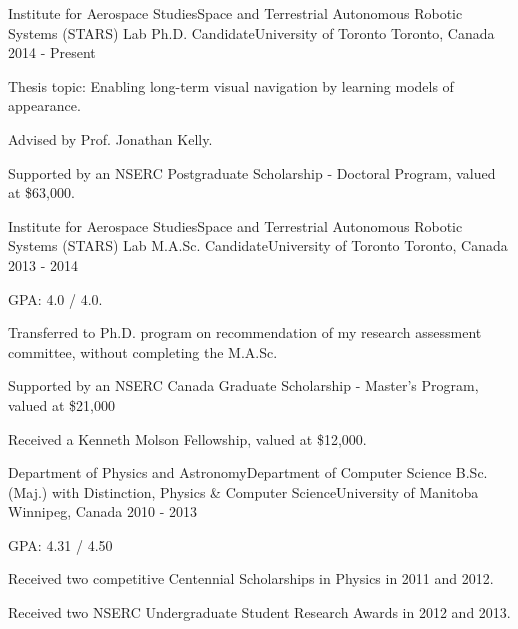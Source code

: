 

\begin{cventries}

  \cventry
    {Institute for Aerospace Studies{\enskip\cdotp\enskip}Space and Terrestrial Autonomous Robotic Systems (STARS) Lab} %
    {Ph.D. Candidate{\enskip\cdotp\enskip}University of Toronto} %
    {Toronto, Canada} %
    {2014 - Present} %
    {
      \begin{cvitems} %
        \item {Thesis topic: Enabling long-term visual navigation by learning models of appearance.}
        \item {Advised by Prof. Jonathan Kelly.}
        \item {Supported by an NSERC Postgraduate Scholarship - Doctoral Program, valued at \$63,000.}
      \end{cvitems}
    }

  \cventry
    {Institute for Aerospace Studies{\enskip\cdotp\enskip}Space and Terrestrial Autonomous Robotic Systems (STARS) Lab} %
    {M.A.Sc. Candidate{\enskip\cdotp\enskip}University of Toronto} %
    {Toronto, Canada} %
    {2013 - 2014} %
    {
      \begin{cvitems} %
        \item {GPA: 4.0 / 4.0.}
        \item {Transferred to Ph.D. program on recommendation of my research assessment committee, without completing the M.A.Sc.}
        \item {Supported by an NSERC Canada Graduate Scholarship - Master’s Program, valued at \$21,000} 
        \item {Received a Kenneth Molson Fellowship, valued at \$12,000.}
      \end{cvitems}
    }

  \cventry
    {Department of Physics and Astronomy{\enskip\cdotp\enskip}Department of Computer Science} %
    {B.Sc. (Maj.) with Distinction, Physics \& Computer Science{\enskip\cdotp\enskip}University of Manitoba} %
    {Winnipeg, Canada} %
    {2010 - 2013} %
    {
      \begin{cvitems} %
        \item {GPA: 4.31 / 4.50}
        \item {Received two competitive Centennial Scholarships in Physics in 2011 and 2012.}
        \item {Received two NSERC Undergraduate Student Research Awards in 2012 and 2013.}
      \end{cvitems}
    }


\end{cventries}
